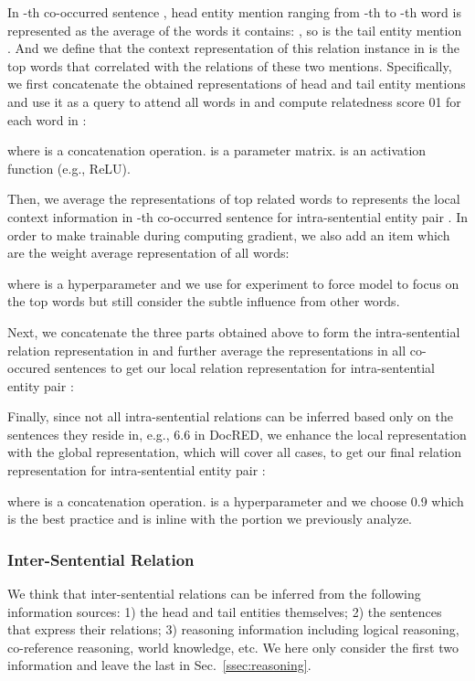 \documentclass[11pt,a4paper]{article}
\begin{document}
In -th co-occurred sentence , head entity mention ranging from -th to -th word is represented as the average of the words it contains: , so is the tail entity mention . 
And we define that the context representation of this relation instance in  is the top  words that correlated with the relations of these two mentions. Specifically, we first concatenate the obtained representations of head and tail entity mentions and use it as a query to attend all words in  and compute relatedness score 01 for each word in  :


where  is a concatenation operation.  is a parameter matrix.  is an activation function (e.g., ReLU).

Then, we average the representations of top  related words to represents the local context information  in -th co-occurred sentence for intra-sentential entity pair . In order to make  trainable during computing gradient, we also add an item which are the weight average representation of all words:

where  is a hyperparameter and we use  for experiment to force model to focus on the top  words but still consider the subtle influence from other words.

Next, we concatenate the three parts obtained above to form the intra-sentential relation representation in  and further average the representations in all co-occured sentences  to get our local relation representation  for intra-sentential entity pair :


Finally, since not all intra-sentential relations can be inferred based only on the sentences they reside in, e.g., 6.6 in DocRED, we enhance the local representation with the global representation, which will cover all cases, to get our final relation representation for intra-sentential entity pair :

where  is a concatenation operation.  is a hyperparameter and we choose 0.9 which is the best practice and is inline with the portion we previously analyze.

\subsubsection{Inter-Sentential Relation}
We think that inter-sentential relations can be inferred from the following information sources: 1) the head and tail entities themselves; 2) the sentences that express their relations; 3) reasoning information including logical reasoning, co-reference reasoning, world knowledge, etc. We here only consider the first two information and leave the last in Sec.~\ref{ssec:reasoning}.
\end{document}
